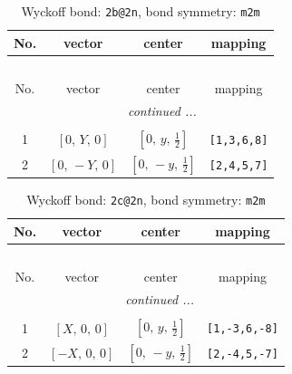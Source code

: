 \documentclass[fleqn,8pt]{jsarticle}
\begin{document}
\renewcommand{\arraystretch}{1.2}
\begin{longtable}{cccc}
\caption{Wyckoff bond: {\tt 2b@2n}, bond symmetry: {\tt m2m}}
 \\
 \hline \hline
No. & vector & center & mapping \\ \hline \endfirsthead

\multicolumn{3}{l}{\tablename\ \thetable{}} \\
 \hline \hline
No. & vector & center & mapping \\ \hline \endhead

 \hline \hline
\multicolumn{3}{r}{\footnotesize\it continued ...} \\ \endfoot

 \hline \hline
\multicolumn{3}{r}{} \\ \endlastfoot

1 & $\left[ 0,\, Y,\, 0 \right]$ & $\left[ 0,\, y,\, \frac{1}{2} \right]$ & {\tt [1,3,6,8]} \\ \hline
2 & $\left[ 0,\, - Y,\, 0 \right]$ & $\left[ 0,\, - y,\, \frac{1}{2} \right]$ & {\tt [2,4,5,7]} \\
\end{longtable}
\renewcommand{\arraystretch}{1.2}
\begin{longtable}{cccc}
\caption{Wyckoff bond: {\tt 2c@2n}, bond symmetry: {\tt m2m}}
 \\
 \hline \hline
No. & vector & center & mapping \\ \hline \endfirsthead

\multicolumn{3}{l}{\tablename\ \thetable{}} \\
 \hline \hline
No. & vector & center & mapping \\ \hline \endhead

 \hline \hline
\multicolumn{3}{r}{\footnotesize\it continued ...} \\ \endfoot

 \hline \hline
\multicolumn{3}{r}{} \\ \endlastfoot

1 & $\left[ X,\, 0,\, 0 \right]$ & $\left[ 0,\, y,\, \frac{1}{2} \right]$ & {\tt [1,-3,6,-8]} \\ \hline
2 & $\left[ - X,\, 0,\, 0 \right]$ & $\left[ 0,\, - y,\, \frac{1}{2} \right]$ & {\tt [2,-4,5,-7]} \\
\end{longtable}
\renewcommand{\arraystretch}{1.2}
\end{document}
